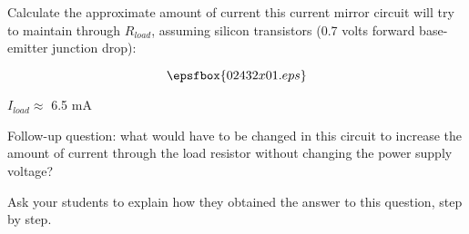 

Calculate the approximate amount of current this current mirror circuit will try to maintain through $R_{load}$, assuming silicon transistors (0.7 volts forward base-emitter junction drop):

$$\epsfbox{02432x01.eps}$$







$I_{load} \approx$ 6.5 mA

\vskip 10pt

Follow-up question: what would have to be changed in this circuit to increase the amount of current through the load resistor without changing the power supply voltage?







Ask your students to explain how they obtained the answer to this question, step by step.





